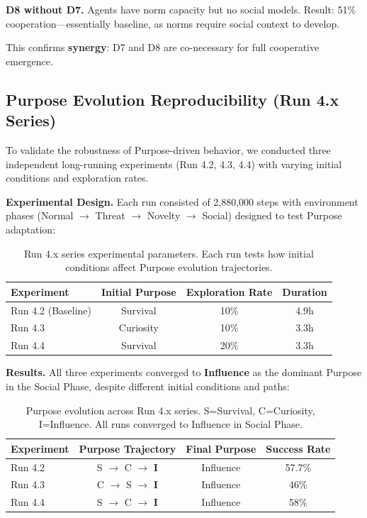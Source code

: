 \documentclass{article}
\begin{document}
\textbf{D8 without D7.} Agents have norm capacity but no social models. Result: 51\% cooperation---essentially baseline, as norms require social context to develop.

This confirms \textbf{synergy}: D7 and D8 are co-necessary for full cooperative emergence.

\subsection{Purpose Evolution Reproducibility (Run 4.x Series)}

To validate the robustness of Purpose-driven behavior, we conducted three independent long-running experiments (Run 4.2, 4.3, 4.4) with varying initial conditions and exploration rates.

\textbf{Experimental Design.} Each run consisted of 2,880,000 steps with environment phases (Normal $\rightarrow$ Threat $\rightarrow$ Novelty $\rightarrow$ Social) designed to test Purpose adaptation:

\begin{table}[h]
\centering
\small
\begin{tabular}{lccc}
\toprule
\textbf{Experiment} & \textbf{Initial Purpose} & \textbf{Exploration Rate} & \textbf{Duration} \\
\midrule
Run 4.2 (Baseline) & Survival & 10\% & 4.9h \\
Run 4.3 & Curiosity & 10\% & 3.3h \\
Run 4.4 & Survival & 20\% & 3.3h \\
\bottomrule
\end{tabular}
\caption{Run 4.x series experimental parameters. Each run tests how initial conditions affect Purpose evolution trajectories.}
\end{table}

\textbf{Results.} All three experiments converged to \textbf{Influence} as the dominant Purpose in the Social Phase, despite different initial conditions and paths:

\begin{table}[h]
\centering
\small
\begin{tabular}{lccc}
\toprule
\textbf{Experiment} & \textbf{Purpose Trajectory} & \textbf{Final Purpose} & \textbf{Success Rate} \\
\midrule
Run 4.2 & S $\rightarrow$ C $\rightarrow$ \textbf{I} & Influence & 57.7\% \\
Run 4.3 & C $\rightarrow$ S $\rightarrow$ \textbf{I} & Influence & 46\% \\
Run 4.4 & S $\rightarrow$ C $\rightarrow$ \textbf{I} & Influence & 58\% \\
\bottomrule
\end{tabular}
\caption{Purpose evolution across Run 4.x series. S=Survival, C=Curiosity, I=Influence. All runs converged to Influence in Social Phase.}
\end{table}
\end{document}
